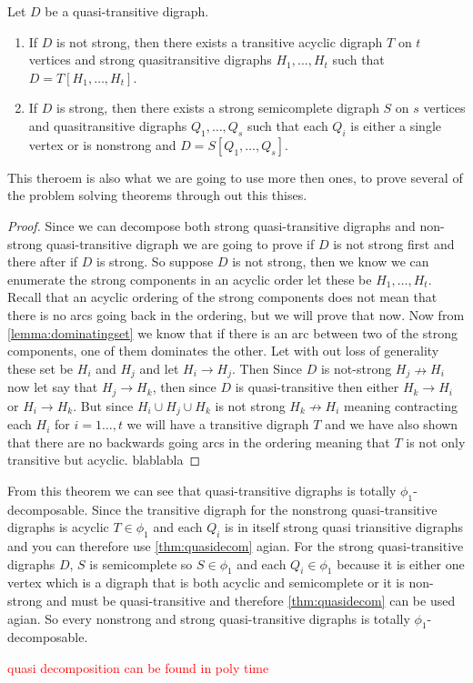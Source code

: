 \begin{thm}\cite{bangJGT85}
    Let $D$ be a quasi-transitive digraph.
    \begin{enumerate}
        \item If $D$ is not strong, then there exists a transitive acyclic digraph $T$ on $t$ vertices and strong quasitransitive digraphs $H_1,\dots,H_t$ such that $D=T[H_1,\dots,H_t]$.
        \item If $D$ is strong, then there exists a strong semicomplete digraph $S$ on $s$ vertices and quasitransitive digraphs $Q_1,\dots ,Q_s$ such that each $Q_i$ is either a single vertex or is nonstrong and $D=S[Q_1,\dots,Q_s]$.
    \end{enumerate}
    \label{thm:quasidecom}
\end{thm}
This theroem is also what we are going to use more then ones, to prove several of the problem solving theorems through out this thises.
\begin{proof}
    Since we can decompose both strong quasi-transitive digraphs and non-strong quasi-transitive digraph we are going to prove if $D$ is not strong first and there after if $D$ is strong.
    So suppose $D$ is not strong, then we know we can enumerate the strong components in an acyclic order let these be $H_1,\dots , H_t$. 
    Recall that an acyclic ordering of the strong components does not mean that there is no arcs going back in the ordering, but we will prove that now. 
    Now from \autoref{lemma:dominatingset} we know that if there is an arc between two of the strong components, one of them dominates the other.
    Let with out loss of generality these set be $H_i$ and $H_j$ and let $H_i\rightarrow H_j$. 
    Then Since $D$ is not-strong $H_j\nrightarrow H_i$ now let say that $H_j \rightarrow H_k$, then since $D$ is quasi-transitive then either $H_k\rightarrow H_i$ or $H_i \rightarrow H_k$. 
    But since $H_i\cup H_j \cup H_k$ is not strong $H_k\nrightarrow H_i$ meaning contracting each $H_i$ for $i=1\dots,t$ we will have a transitive digraph $T$ and we have also shown that there are no backwards going arcs in the ordering meaning that $T$ is not only transitive but acyclic. 
    blablabla
\end{proof}
From this theorem we can see that quasi-transitive digraphs is totally $\phi_1$-decomposable. 
Since the transitive digraph for the nonstrong quasi-transitive digraphs is acyclic $T\in \phi_1$ and each $Q_i$ is in itself strong quasi triansitive digraphs and you can therefore use \autoref{thm:quasidecom} agian.  
For the strong quasi-transitive digraphs $D$, $S$ is semicomplete so $S\in \phi_1$ and each $Q_i \in \phi_1$ because it is either one vertex which is a digraph that is both acyclic and semicomplete or it is non-strong and must be quasi-transitive and therefore \autoref{thm:quasidecom} can be used agian. So every nonstrong and strong quasi-transitive digraphs is totally $\phi_1$-decomposable.

\begin{thm}
    \textcolor{red}{quasi decomposition can be found in poly time}
\end{thm}
